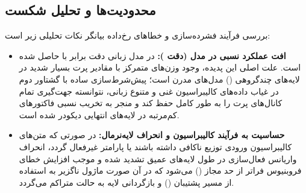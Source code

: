 \subsection{محدودیت‌ها و تحلیل شکست}
بررسی فرآیند فشرده‌سازی و خطاهای رخ‌داده بیانگر نکات تحلیلی زیر است:
\begin{itemize}
    \item \textbf{افت عملکرد نسبی در مدل  (دقت ):} در مدل زبانی  دقت برابر با  حاصل شده است. علت اصلی این پدیده، وجود وزن‌های متمرکز با مقادیر پرت بسیار شدید در لایه‌های چندگروهی () مدل‌های مدرن است؛ پیش‌شرط‌سازی ساده با گشتاور دوم در غیاب داده‌های کالیبراسیون غنی و متنوع زبانی، نتوانسته جهت‌گیری تمام کانال‌های پرت را به طور کامل حفظ کند و منجر به تخریب نسبی فاکتورهای کم‌مرتبه در لایه‌های انتهایی دیکودر شده است.
    \item \textbf{حساسیت به فرآیند کالیبراسیون و انحراف لایه‌نرمال:} در صورتی که متن‌های کالیبراسیون ورودی توزیع ناکافی داشته باشند یا پارامتر  غیرفعال گردد، انحراف واریانس فعال‌سازی در طول لایه‌های عمیق تشدید شده و موجب افزایش خطای فروبنیوس فراتر از حد مجاز () می‌شود که در آن صورت ماژول ناگزیر به استفاده از مسیر پشتیبان () و بازگردانی لایه به حالت متراکم می‌گردد.
\end{itemize}
